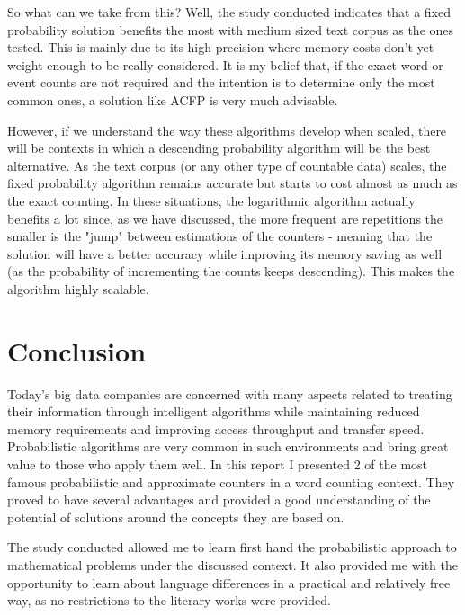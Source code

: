 \documentclass[shortpaper]{revdetua}
\begin{document}
So what can we take from this?
Well, the study conducted indicates that a fixed probability solution benefits 
the most with medium sized text corpus as the ones tested.
This is mainly due to its high precision where memory costs don't yet weight 
enough to be really considered.
It is my belief that, if the exact word or event counts are not required and 
the intention is to determine only the most common ones, a solution like ACFP is 
very much advisable.

However, if we understand the way these algorithms develop when scaled, there
will be contexts in which a descending probability algorithm will be the best 
alternative.
As the text corpus (or any other type of countable data) scales, the fixed 
probability algorithm remains accurate but starts to cost almost as much as the
exact counting.
In these situations, the logarithmic algorithm actually benefits a lot since, 
as we have discussed, the more frequent are repetitions the smaller 
is the "jump" between estimations of the counters - meaning that the solution 
will have a better accuracy while improving its memory saving as well 
(as the probability of incrementing the counts keeps descending).
This makes the algorithm highly scalable.


\section{Conclusion}

Today's big data companies are concerned with many aspects related to treating 
their information through intelligent algorithms while maintaining reduced 
memory requirements and improving access throughput and transfer speed.
Probabilistic algorithms are very common in such environments and bring great 
value to those who apply them well.
In this report I presented 2 of the most famous probabilistic and approximate 
counters in a word counting context.
They proved to have several advantages and provided a good understanding of the 
potential of solutions around the concepts they are based on.

The study conducted allowed me to learn first hand the probabilistic approach to 
mathematical problems under the discussed context.
It also provided me with the opportunity to learn about language differences in 
a practical and relatively free way, as no restrictions to the literary works 
were provided.
\end{document}

